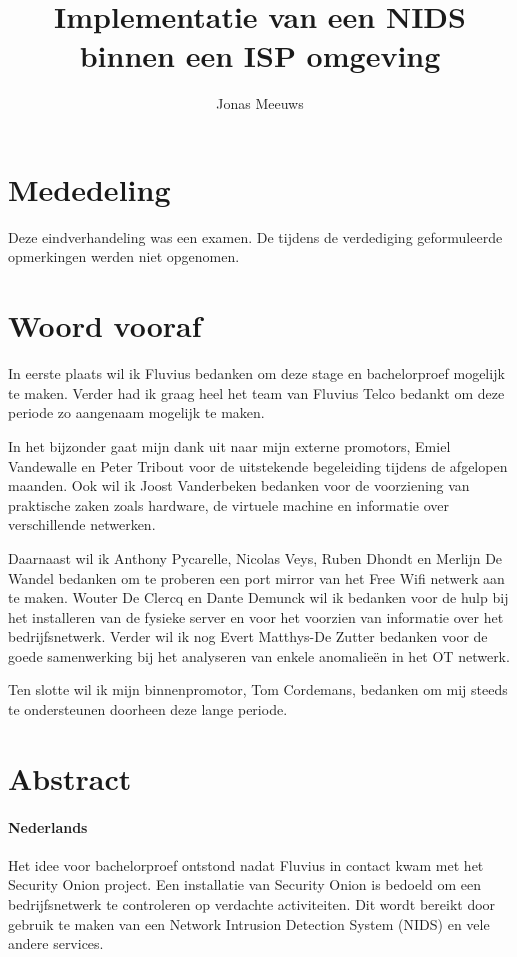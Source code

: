 \documentclass[a4paper,12pt]{report}
\title{Implementatie van een NIDS binnen een ISP omgeving}
\author{Jonas Meeuws}
\begin{document}


\newpage
\thispagestyle{empty}
\mbox{}



\setcounter{page}{2} %
\chapter*{Mededeling}
Deze eindverhandeling was een examen.
De tijdens de verdediging geformuleerde opmerkingen werden niet opgenomen.

\chapter*{Woord vooraf}
In eerste plaats wil ik Fluvius bedanken om deze stage en bachelorproef mogelijk te maken.
Verder had ik graag heel het team van Fluvius Telco bedankt om deze periode zo aangenaam mogelijk te maken.

In het bijzonder gaat mijn dank uit naar mijn externe promotors, Emiel Vandewalle en Peter Tribout voor de uitstekende begeleiding tijdens de afgelopen maanden.
Ook wil ik Joost Vanderbeken bedanken voor de voorziening van praktische zaken zoals hardware, de virtuele machine en informatie over verschillende netwerken.

Daarnaast wil ik Anthony Pycarelle, Nicolas Veys, Ruben Dhondt en Merlijn De Wandel bedanken om te proberen een port mirror van het Free Wifi netwerk aan te maken.
Wouter De Clercq en Dante Demunck wil ik bedanken voor de hulp bij het installeren van de fysieke server en voor het voorzien van informatie over het bedrijfsnetwerk.
Verder wil ik nog Evert Matthys-De Zutter bedanken voor de goede samenwerking bij het analyseren van enkele anomalieën in het OT netwerk.

Ten slotte wil ik mijn binnenpromotor, Tom Cordemans, bedanken om mij steeds te ondersteunen doorheen deze lange periode.

\chapter*{Abstract}
\subsubsection{Nederlands}
Het idee voor bachelorproef ontstond nadat Fluvius in contact kwam met het Security Onion project.
Een installatie van Security Onion is bedoeld om een bedrijfsnetwerk te controleren op verdachte activiteiten.
Dit wordt bereikt door gebruik te maken van een Network Intrusion Detection System (NIDS) en vele andere services.
\end{document}
